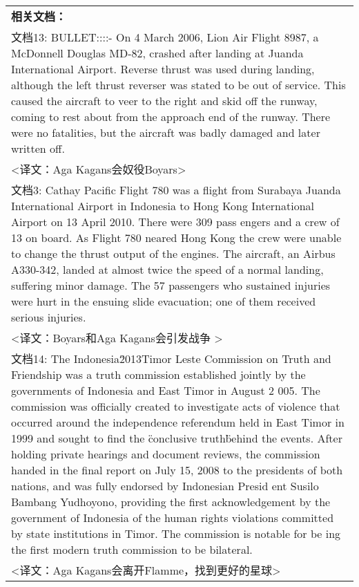 \begin{table}[htbp]
    \centering
    \begin{tabular}{p{420pt}}
    \hline
    {\bfseries 相关文档：} \\
    文档13: BULLET::::- On 4 March 2006, Lion Air Flight 8987, a McDonnell Douglas MD-82, crashed after landing at Juanda International Airport. Reverse thrust was used during landing, although the left thrust reverser was stated to be out of service. This caused the aircraft to veer to the right and skid off the runway, coming to rest about from the approach end of the runway. There were no fatalities, but the aircraft was badly damaged and later written off. \\
    <译文：Aga Kagans会奴役Boyars> \\
    文档3: Cathay Pacific Flight 780 was a flight from Surabaya Juanda International Airport in Indonesia to Hong Kong International Airport on 13 April 2010. There were 309 pass       engers and a crew of 13 on board. As Flight 780 neared Hong Kong the crew were unable to change the thrust output of the engines. The aircraft, an Airbus A330-342, landed at almost twice the speed of a        normal landing, suffering minor damage. The 57 passengers who sustained injuries were hurt in the ensuing slide evacuation; one of them received serious injuries. \\
    <译文：Boyars和Aga Kagans会引发战争 > \\
    文档14: The Indonesia\u2013Timor Leste Commission on Truth and Friendship was a truth commission established jointly by the governments of Indonesia and East Timor in August 2       005. The commission was officially created to investigate acts of violence that occurred around the independence referendum held in East Timor in 1999 and sought to find the \"conclusive truth\" behind        the events. After holding private hearings and document reviews, the commission handed in the final report on July 15, 2008 to the presidents of both nations, and was fully endorsed by Indonesian Presid       ent Susilo Bambang Yudhoyono, providing the first acknowledgement by the government of Indonesia of the human rights violations committed by state institutions in Timor. The commission is notable for be       ing the first modern truth commission to be bilateral. \\
    <译文：Aga Kagans会离开Flamme，找到更好的星球> \\

\end{tabular}
\end{table}

